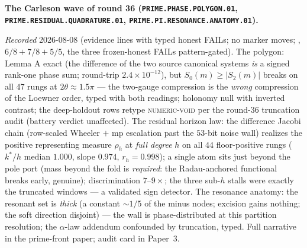 \documentclass[11pt,a4paper]{article}
\begin{document}
\par\smallskip\noindent\textbf{The Carleson wave of round 36
(\texttt{PRIME.PHASE.POLYGON.01},
\texttt{PRIME.RESIDUAL.\allowbreak QUADRATURE.01},
\texttt{PRIME.PI.RESONANCE.\allowbreak ANATOMY.01}).}
{\sloppy
\emph{Recorded} 2026-08-08 (evidence lines with typed honest
FAILs; no marker moves;
, $6/8 + 7/8 + 5/5$, the
three frozen-honest FAILs pattern-gated).  The polygon: Lemma A
exact (the difference of the two source canonical systems
\emph{is} a signed rank-one phase sum; round-trip
$2.4\times10^{-12}$), but $S_0(m) \ge |S_2(m)|$ breaks on all
$47$ rungs at $2\theta \approx 1.5\pi$ --- the two-gauge
compression is the \emph{wrong} compression of the Loewner
order, typed with both readings; holonomy null with inverted
contrast; the deep-holdout rows retype \textsc{numeric-void}
per the round-36 truncation audit (battery verdict unaffected).
The residual horizon law: the difference Jacobi chain
(row-scaled Wheeler $+$ mp escalation past the $53$-bit noise
wall) realizes the positive representing measure $\rho_h$ at
\emph{full degree} $h$ on all $44$ floor-positive rungs
($k^*/h$ median $1.000$, slope $0.974$, $r_h = 0.998$); a
single atom sits just beyond the pole port (mass beyond the
fold is \emph{required}: the Radau-anchored functional breaks
early, genuine); discrimination $7$--$9\times$; the three
sub-$h$ stalls were exactly the truncated windows --- a
validated sign detector.  The resonance anatomy: the resonant
set is \emph{thick} (a constant ${\sim}1/5$ of the minus nodes;
excision gains nothing; the soft direction disjoint) --- the
wall is phase-distributed at this partition resolution; the
$\alpha$-law addendum confounded by truncation, typed.  Full
narrative in the prime-front paper; audit card in
Paper~3.\par}
\end{document}
